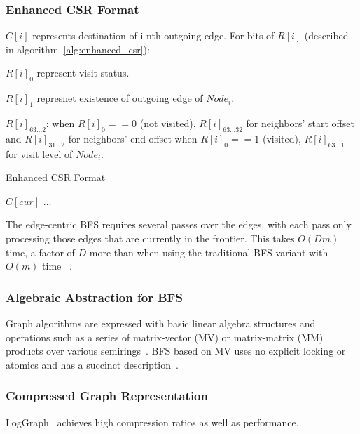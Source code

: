\documentclass[UTF8,12pt,a4paper]{article}
\begin{document}
\subsubsection{Enhanced CSR Format}
$C[i]$ represents destination of i-nth outgoing edge.
For bits of $R[i]$ (described in algorithm~\ref{alg:enhanced_csr}):
\begin{compactitem}
  \item $R[i]_0$ represent visit status.
  \item $R[i]_1$ represnet existence of outgoing edge of $Node_i$.
  \item $R[i]_{63...2}$:
  when $R[i]_0 == 0$ (not visited),
  $R[i]_{63...32}$ for neighbors' start offset
  and $R[i]_{31...2}$ for neighbors' end offset
  when $R[i]_0 == 1$ (visited),
  $R[i]_{63...1}$ for visit level of $Node_i$.
\end{compactitem}
\begin{algorithm}
  \algrenewcommand{}
  \algrenewcommand{}
  \caption{Enhanced CSR Format}
  \label{alg:enhanced_csr}
  \begin{algorithmic}[1]
      \State $C[cur]$ ...
    \EndFor
  \end{algorithmic}
\end{algorithm}
The edge-centric BFS requires several passes over the edges,
with each pass only processing those edges that are currently in the frontier.
This takes $O(Dm)$ time, a factor of $D$ more than when using the traditional BFS variant
with $O(m)$ time ~\cite{DBLP:conf/hpdc/BestaPGSH17}.
\subsubsection{Algebraic Abstraction for BFS}
Graph algorithms are expressed with basic linear algebra structures
and operations such as a series of matrix-vector (MV) or matrix-matrix (MM) products
over various semirings~\cite{DBLP:conf/fpl/UmurogluMJ15}.
BFS based on MV uses no explicit locking or atomics
and has a succinct description~\cite{DBLP:conf/ipps/BestaMSH17}.
\subsubsection{Compressed Graph Representation}
LogGraph~\cite{DBLP:conf/IEEEpact/BestaSZSHH18}
achieves high compression ratios as well as performance.
\end{document}
